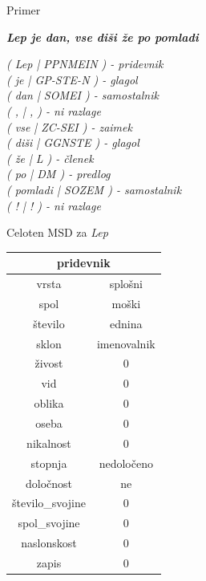 \documentclass{beamer}
\begin{document}
\begin{frame}{Primer}
\begin{center}
\textit{\textbf{Lep je dan, vse diši že po pomladi}}
\end{center}
\textit{( Lep  |  PPNMEIN ) - pridevnik\\
	( je  |  GP-STE-N ) - glagol\\
	( dan  |  SOMEI ) - samostalnik\\
	( ,  |  , ) - ni razlage\\
	( vse  |  ZC-SEI ) - zaimek\\
	( diši  |  GGNSTE ) - glagol\\
	( že  |  L ) - členek\\
	( po  |  DM ) - predlog\\
	( pomladi  |  SOZEM ) - samostalnik\\
	( !  |  ! ) - ni razlage}\\
\end{frame}

\begin{frame}{Celoten MSD za \textit{Lep} }
\begin{center}
\begin{tabular}{c|c}
\multicolumn{2}{c}{pridevnik}\\\hline\hline
vrsta & splošni \\
spol & moški \\
število & ednina \\
sklon & imenovalnik \\
živost & 0 \\
vid & 0 \\
oblika & 0 \\
oseba & 0 \\
nikalnost & 0 \\
stopnja & nedoločeno \\
določnost & ne \\
število\_svojine & 0 \\
spol\_svojine & 0 \\
naslonskost & 0 \\
zapis & 0 \\
\end{tabular}
\end{center}
\end{frame}
\end{document}
